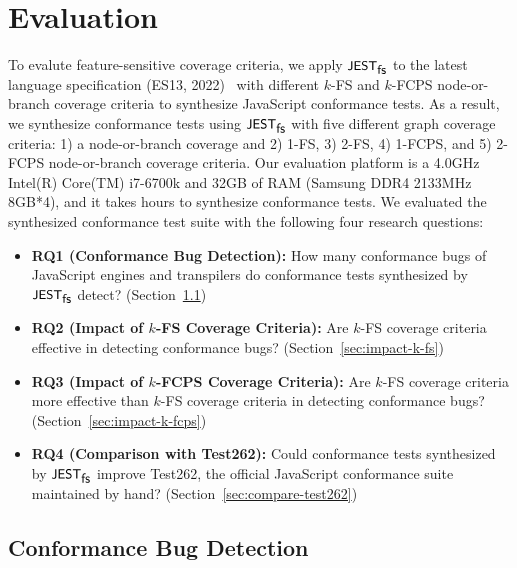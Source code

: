 \section{Evaluation}\label{sec:eval}

To evalute feature-sensitive coverage criteria, we apply $\textsf{\small JEST}_{\textsf{\small fs}}$ to the latest
language specification (ES13, 2022)~\cite{es13} with different $k$-FS and
$k$-FCPS node-or-branch coverage criteria to synthesize JavaScript conformance
tests.
%
As a result, we synthesize  conformance tests using $\textsf{\small JEST}_{\textsf{\small fs}}$ with
five different graph coverage criteria: 1) a node-or-branch coverage and 2)
1-FS, 3) 2-FS, 4) 1-FCPS, and 5) 2-FCPS node-or-branch coverage criteria.
%
Our evaluation platform is a 4.0GHz Intel(R) Core(TM) i7-6700k and 32GB of RAM
(Samsung DDR4 2133MHz 8GB*4), and it takes  hours to synthesize
conformance tests.
%
We evaluated the synthesized conformance test suite with the following four
research questions:
\begin{itemize}
  \item \textbf{RQ1 (Conformance Bug Detection):} How many conformance bugs of
    JavaScript engines and transpilers do conformance tests synthesized by
    $\textsf{\small JEST}_{\textsf{\small fs}}$ detect? (Section~\ref{sec:conform-bug})
  \item \textbf{RQ2 (Impact of $k$-FS Coverage Criteria):} Are $k$-FS coverage
    criteria effective in detecting conformance bugs?
    (Section~\ref{sec:impact-k-fs})
  \item \textbf{RQ3 (Impact of $k$-FCPS Coverage Criteria):} Are $k$-FS coverage
    criteria more effective than $k$-FS coverage criteria in detecting
    conformance bugs? (Section~\ref{sec:impact-k-fcps})
  \item \textbf{RQ4 (Comparison with Test262):} Could conformance tests
    synthesized by $\textsf{\small JEST}_{\textsf{\small fs}}$ improve Test262, the official JavaScript conformance
    suite maintained by hand? (Section~\ref{sec:compare-test262})
\end{itemize}


\subsection{Conformance Bug Detection}\label{sec:conform-bug}

